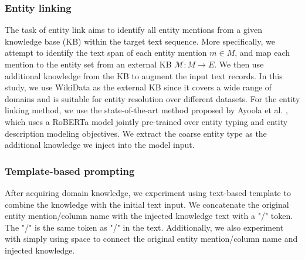 \subsubsection{Entity linking}
The task of entity link aims to identify all entity mentions from a given knowledge base (KB) within the target text sequence. More specifically, we attempt to identify the text span of each entity mention $m \in M$, and map each mention to the entity set from an external KB $\mathcal{M}: M \rightarrow E$. 
We then use additional knowledge from the KB to augment the input text records.
In this study, we use WikiData as the external KB since it covers a wide range of domains and is suitable for entity resolution over different datasets. For the entity linking method, we use the state-of-the-art method proposed by Ayoola et al. \cite{ayoola_refined_2022}, which uses a RoBERTa model jointly pre-trained over entity typing and entity description modeling objectives. We extract the coarse entity type as the additional knowledge we inject into the model input.


\subsubsection{Template-based prompting}
After acquiring domain knowledge, we experiment using text-based template to combine the knowledge with the initial text input. We concatenate the original entity mention/column name with the injected knowledge text with a "/" token. The "/" is the same token as "/" in the text. 
Additionally, we also experiment with simply using space to connect the original entity mention/column name and injected knowledge. 



